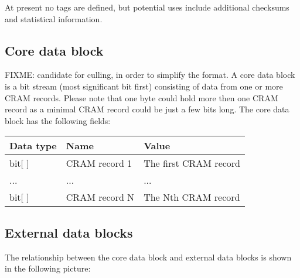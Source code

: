\documentclass[a4paper]{article}
\begin{document}
At present no tags are defined, but potential uses include additional
checksums and statistical information.

%
% 


\subsection{\textbf{Core data block}}

{\color{gray}
FIXME: candidate for culling, in order to simplify the format.
}
A core data block is a bit stream (most significant bit first) consisting of data from one 
or more CRAM records. Please note that one byte could hold more then one CRAM record 
as a minimal CRAM record could be just a few bits long. The core data block has 
the following fields:

\begin{tabular}{|l|>{\raggedright}p{120pt}|>{\raggedright}p{260pt}|}
\hline
\textbf{Data type} & \textbf{Name} & \textbf{Value}
\tabularnewline
\hline
bit[ ] & CRAM record 1 & The first CRAM record\tabularnewline
\hline
... & ... & ...\tabularnewline
\hline
bit[ ] & CRAM record N & The Nth CRAM record \tabularnewline
\hline
\end{tabular}

\subsection{\textbf{External data blocks}}

The relationship between the core data block and external data blocks is shown in the following 
picture: 
\end{document}
